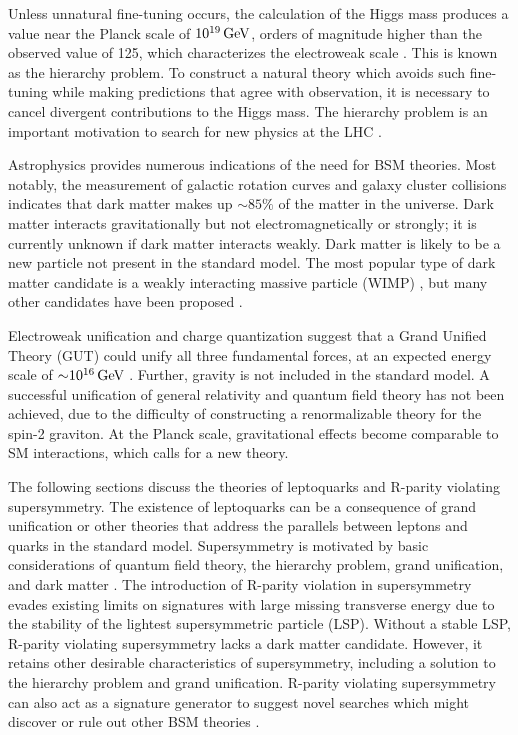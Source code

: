 Unless unnatural fine-tuning occurs, the calculation of the Higgs mass produces a value near the Planck scale of $10^{19}\,\text{Ge\hspace{-.08em}V}$, orders of magnitude higher than the observed value of 125\GeV, which characterizes the electroweak scale \cite{Susskind1984181}. This is known as the hierarchy problem. To construct a natural theory which avoids such fine-tuning while making predictions that agree with observation, it is necessary to cancel divergent contributions to the Higgs mass. The hierarchy problem is an important motivation to search for new physics at the LHC \cite{Morrissey20121}.

Astrophysics provides numerous indications of the need for BSM theories. Most notably, the measurement of galactic rotation curves and galaxy cluster collisions \cite{BulletCluster} indicates that dark matter makes up ${\sim} 85\%$ of the matter in the universe. Dark matter interacts gravitationally but not electromagnetically or strongly; it is currently unknown if dark matter interacts weakly. Dark matter is likely to be a new particle not present in the standard model. The most popular type of dark matter candidate is a weakly interacting massive particle (WIMP) \cite{Morrissey20121}, but many other candidates have been proposed \cite{PDG}.

Electroweak unification and charge quantization suggest that a Grand Unified Theory (GUT) could unify all three fundamental forces, at an expected energy scale of ${\sim} 10^{16}\,\text{Ge\hspace{-.08em}V}$ \cite{PhysRevLett.33.451}. Further, gravity is not included in the standard model. A successful unification of general relativity and quantum field theory has not been achieved, due to the difficulty of constructing a renormalizable theory for the spin-2 graviton. At the Planck scale, gravitational effects become comparable to SM interactions, which calls for a new theory.

The following sections discuss the theories of leptoquarks and R-parity violating supersymmetry. The existence of leptoquarks can be a consequence of grand unification or other theories that address the parallels between leptons and quarks in the standard model. Supersymmetry is motivated by basic considerations of quantum field theory, the hierarchy problem, grand unification, and dark matter \cite{SUSY1,SUSY2}. The introduction of R-parity violation in supersymmetry evades existing limits on signatures with large missing transverse energy due to the stability of the lightest supersymmetric particle (LSP). Without a stable LSP, R-parity violating supersymmetry lacks a dark matter candidate. However, it retains other desirable characteristics of supersymmetry, including a solution to the hierarchy problem and grand unification. R-parity violating supersymmetry can also act as a signature generator to suggest novel searches which might discover or rule out other BSM theories \cite{EvansSigGen}.

